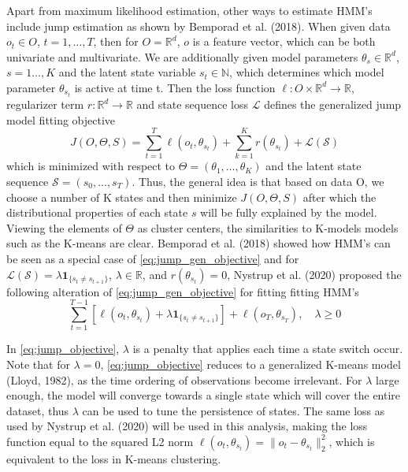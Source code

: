 Apart from maximum likelihood estimation, other ways to estimate HMM's include jump estimation as shown by Bemporad et al. (2018). When given data $o_t\in O$, $t=1,\ldots,T$, then for $O = \mathbb{R}^d$, $o$ is a feature vector, which can be both univariate and multivariate. We are additionally given model parameters $\theta_s\in \mathbb{R}^d$, $s=1...,K$ and the latent state variable $s_t\in\mathbb{N}$, which determines which model parameter $\theta_{s_t}$ is active at time t. Then the loss function $\ell: O\times\mathbb{R}^d \rightarrow\mathbb{R}$, regularizer term $r: \mathbb{R}^d \rightarrow \mathbb{R}$ and state sequence loss $\mathcal{L}$ defines the generalized jump model fitting objective
\begin{equation}
    J(O, \Theta, S) = \sum_{t=1}^T \ell(o_t,\theta_{s_t}) + \sum_{k=1}^K r(\theta_{s_t}) + \mathcal{L(S)}
\label{eq:jump_gen_objective}    
\end{equation}
which is minimized with respect to $\Theta=(\theta_1,\ldots,\theta_K)$ and the latent state sequence $\mathcal{S}=(s_0,\ldots,s_T)$. Thus, the general idea is that based on data O, we choose a number of K states and then minimize $J(O, \Theta, S)$ after which the distributional properties of each state $s$ will be fully explained by the model. Viewing the elements of $\Theta$ as cluster centers, the similarities to K-models models such as the K-means are clear. Bemporad et al. (2018) showed how HMM's can be seen as a special case of \cref{eq:jump_gen_objective} and for $\mathcal{L(S)} = \lambda\mathbf{1}_{\{ s_t\ne s_{t+1}\}}$, $\lambda \in \mathbb{R}$, and $r(\theta_{s_t})=0$, Nystrup et al. (2020) proposed the following alteration of \cref{eq:jump_gen_objective} for fitting fitting HMM's
\begin{equation}
    \sum_{t=1}^{T-1}[\ell(o_t, \theta_{s_t}) + \lambda\mathbf{1}_{\{ s_t\ne s_{t+1} \}}]
    + \ell(o_T, \theta_{s_T})
    ,\quad \lambda \geq 0
\label{eq:jump_objective}
\end{equation}

In \cref{eq:jump_objective}, $\lambda$ is a penalty that applies each time a state switch occur. Note that for $\lambda=0$, \cref{eq:jump_objective} reduces to a generalized K-means model (Lloyd, 1982), as the time ordering of observations become irrelevant. For $\lambda$ large enough, the model will converge towards a single state which will cover the entire dataset, thus $\lambda$ can be used to tune the persistence of states. The same loss as used by Nystrup et al. (2020) will be used in this analysis, making the loss function equal to the squared L2 norm $\ell(o_t, \theta_{s_t}) = \| o_t - \theta_{s_t} \|_2^2$, which is equivalent to the loss in K-means clustering.



